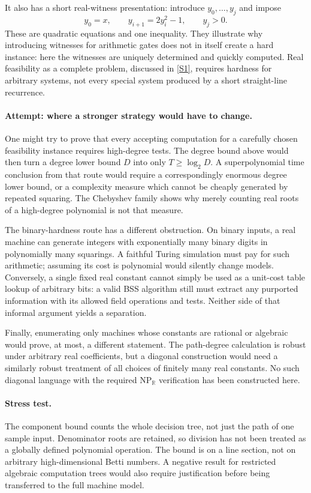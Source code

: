 \documentclass[11pt,a4paper]{article}
\newcommand{\R}{\mathbb{R}}
\newcommand{\sref}[2]{\hyperlink{source:#1:#2}{[S#2]}}
\numberwithin{equation}{section}
\begin{document}
It also has a short real-witness presentation: introduce $y_0,\ldots,y_j$
and impose
\[
 y_0=x,\qquad y_{i+1}=2y_i^2-1,\qquad y_j>0.
\]
These are quadratic equations and one inequality. They illustrate why
introducing witnesses for arithmetic gates does not in itself create a
hard instance: here the witnesses are uniquely determined and quickly
computed. Real feasibility as a complete problem, discussed in
\sref{172}{1}, requires hardness for arbitrary systems, not every special
system produced by a short straight-line recurrence.

\paragraph{Attempt: where a stronger strategy would have to change.}
One might try to prove that every accepting computation for a carefully
chosen feasibility instance requires high-degree tests. The degree bound
above would then turn a degree lower bound $D$ into only $T\ge\log_2D$.
A superpolynomial time conclusion from that route would require a
correspondingly enormous degree lower bound, or a complexity measure which
cannot be cheaply generated by repeated squaring. The Chebyshev family
shows why merely counting real roots of a high-degree polynomial is not
that measure.

The binary-hardness route has a different obstruction. On binary inputs,
a real machine can generate integers with exponentially many binary digits
in polynomially many squarings. A faithful Turing simulation must pay for
such arithmetic; assuming its cost is polynomial would silently change
models. Conversely, a single fixed real constant cannot simply be used as
a unit-cost table lookup of arbitrary bits: a valid BSS algorithm still
must extract any purported information with its allowed field operations
and tests. Neither side of that informal argument yields a separation.

Finally, enumerating only machines whose constants are rational or algebraic
would prove, at most, a different statement. The path-degree calculation
is robust under arbitrary real coefficients, but a diagonal construction
would need a similarly robust treatment of all choices of finitely many
real constants. No such diagonal language with the required
$\mathrm{NP}_{\R}$ verification has been constructed here.

\paragraph{Stress test.}
The component bound counts the whole decision tree, not just the path of
one sample input. Denominator roots are retained, so division has not been
treated as a globally defined polynomial operation. The bound is on a line
section, not on arbitrary high-dimensional Betti numbers. A negative result
for restricted algebraic computation trees would also require justification
before being transferred to the full machine model.
\end{document}
